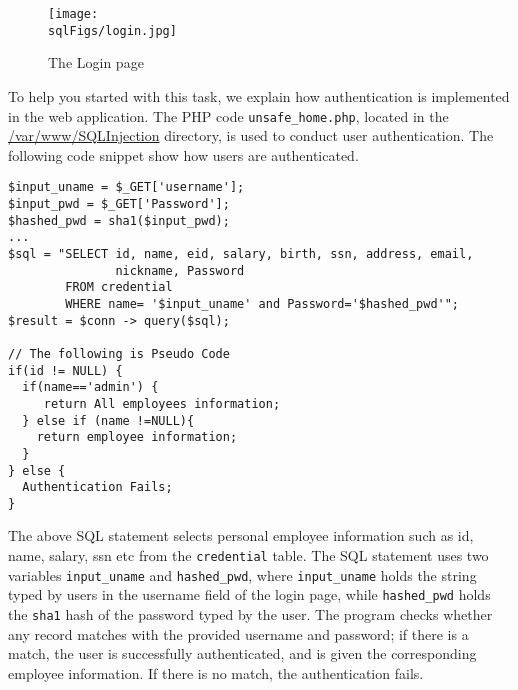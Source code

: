 \begin{figure}[htb]
\begin{center}
\texttt{[image: \\sqlFigs/login.jpg]}
\end{center}
\caption{The Login page}
\label{sql:fig:login}
\end{figure}
 

To help you started with this task, we explain how authentication
is implemented in the web application. The PHP code 
\texttt{unsafe\_home.php}, located in the \url{/var/www/SQLInjection} directory, 
is used to conduct user authentication.
The following code snippet show how users are authenticated. 

\begin{lstlisting}
$input_uname = $_GET['username'];
$input_pwd = $_GET['Password'];
$hashed_pwd = sha1($input_pwd);
...
$sql = "SELECT id, name, eid, salary, birth, ssn, address, email, 
               nickname, Password
        FROM credential
        WHERE name= '$input_uname' and Password='$hashed_pwd'";
$result = $conn -> query($sql);

// The following is Pseudo Code 
if(id != NULL) {
  if(name=='admin') {
     return All employees information;
  } else if (name !=NULL){
    return employee information;
  }
} else {
  Authentication Fails;
}
\end{lstlisting}

The above SQL statement selects personal employee information such as id,
name, salary, ssn etc from the {\tt credential} table. The SQL statement
uses two variables \texttt{input\_uname} and \texttt{hashed\_pwd},
where \texttt{input\_uname} holds the string typed by 
users in the username field of the login page, while 
\texttt{hashed\_pwd} holds the \texttt{sha1} hash of the password typed by
the user. The program checks whether 
any record matches with the provided username and password; if there is a match,
the user is successfully authenticated, and is given the corresponding 
employee information. If there is no match, the authentication
fails. 



